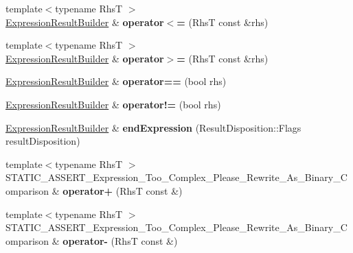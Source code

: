 \begin{DoxyCompactItemize}
\item 
\hypertarget{class_catch_1_1_expression_lhs_a6d43fbf5741cae70b1908ed75ac19784}{{\footnotesize template$<$typename Rhs\-T $>$ }\\\hyperlink{class_catch_1_1_expression_result_builder}{Expression\-Result\-Builder} \& {\bfseries operator$<$=} (Rhs\-T const \&rhs)}\label{class_catch_1_1_expression_lhs_a6d43fbf5741cae70b1908ed75ac19784}

\item 
\hypertarget{class_catch_1_1_expression_lhs_ae197c4a4d3fb35e01ede684c6e75115f}{{\footnotesize template$<$typename Rhs\-T $>$ }\\\hyperlink{class_catch_1_1_expression_result_builder}{Expression\-Result\-Builder} \& {\bfseries operator$>$=} (Rhs\-T const \&rhs)}\label{class_catch_1_1_expression_lhs_ae197c4a4d3fb35e01ede684c6e75115f}

\item 
\hypertarget{class_catch_1_1_expression_lhs_a11906256509e816eb51eff3e24154d47}{\hyperlink{class_catch_1_1_expression_result_builder}{Expression\-Result\-Builder} \& {\bfseries operator==} (bool rhs)}\label{class_catch_1_1_expression_lhs_a11906256509e816eb51eff3e24154d47}

\item 
\hypertarget{class_catch_1_1_expression_lhs_ae4e25cde313de9d8fcaec5bcfaededb4}{\hyperlink{class_catch_1_1_expression_result_builder}{Expression\-Result\-Builder} \& {\bfseries operator!=} (bool rhs)}\label{class_catch_1_1_expression_lhs_ae4e25cde313de9d8fcaec5bcfaededb4}

\item 
\hypertarget{class_catch_1_1_expression_lhs_a73dc3afbc25d3bff40254b322197fb25}{\hyperlink{class_catch_1_1_expression_result_builder}{Expression\-Result\-Builder} \& {\bfseries end\-Expression} (Result\-Disposition\-::\-Flags result\-Disposition)}\label{class_catch_1_1_expression_lhs_a73dc3afbc25d3bff40254b322197fb25}

\item 
\hypertarget{class_catch_1_1_expression_lhs_a29ffb8417e977f0a98c0eb537a7ca5af}{{\footnotesize template$<$typename Rhs\-T $>$ }\\S\-T\-A\-T\-I\-C\-\_\-\-A\-S\-S\-E\-R\-T\-\_\-\-Expression\-\_\-\-Too\-\_\-\-Complex\-\_\-\-Please\-\_\-\-Rewrite\-\_\-\-As\-\_\-\-Binary\-\_\-\-Comparison \& {\bfseries operator+} (Rhs\-T const \&)}\label{class_catch_1_1_expression_lhs_a29ffb8417e977f0a98c0eb537a7ca5af}

\item 
\hypertarget{class_catch_1_1_expression_lhs_a19ef0a33442bb18efef1ec65102151d1}{{\footnotesize template$<$typename Rhs\-T $>$ }\\S\-T\-A\-T\-I\-C\-\_\-\-A\-S\-S\-E\-R\-T\-\_\-\-Expression\-\_\-\-Too\-\_\-\-Complex\-\_\-\-Please\-\_\-\-Rewrite\-\_\-\-As\-\_\-\-Binary\-\_\-\-Comparison \& {\bfseries operator-\/} (Rhs\-T const \&)}\label{class_catch_1_1_expression_lhs_a19ef0a33442bb18efef1ec65102151d1}


\end{DoxyCompactItemize}
